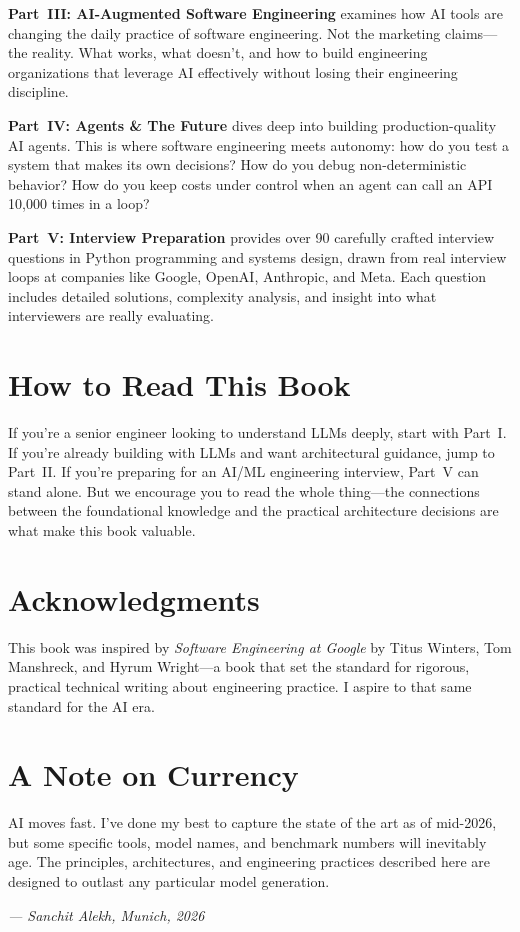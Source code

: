\textbf{Part~III: AI-Augmented Software Engineering} examines how AI tools are changing the daily practice of software engineering. Not the marketing claims---the reality. What works, what doesn't, and how to build engineering organizations that leverage AI effectively without losing their engineering discipline.

\textbf{Part~IV: Agents \& The Future} dives deep into building production-quality AI agents. This is where software engineering meets autonomy: how do you test a system that makes its own decisions? How do you debug non-deterministic behavior? How do you keep costs under control when an agent can call an API 10,000 times in a loop?

\textbf{Part~V: Interview Preparation} provides over 90 carefully crafted interview questions in Python programming and systems design, drawn from real interview loops at companies like Google, OpenAI, Anthropic, and Meta. Each question includes detailed solutions, complexity analysis, and insight into what interviewers are really evaluating.

\section*{How to Read This Book}

If you're a senior engineer looking to understand LLMs deeply, start with Part~I. If you're already building with LLMs and want architectural guidance, jump to Part~II. If you're preparing for an AI/ML engineering interview, Part~V can stand alone. But we encourage you to read the whole thing---the connections between the foundational knowledge and the practical architecture decisions are what make this book valuable.

\section*{Acknowledgments}

This book was inspired by \emph{Software Engineering at Google} by Titus Winters, Tom Manshreck, and Hyrum Wright---a book that set the standard for rigorous, practical technical writing about engineering practice. I aspire to that same standard for the AI era.

\section*{A Note on Currency}

AI moves fast. I've done my best to capture the state of the art as of mid-2026, but some specific tools, model names, and benchmark numbers will inevitably age. The principles, architectures, and engineering practices described here are designed to outlast any particular model generation.

\vspace{1cm}
\hfill\textit{--- Sanchit Alekh, Munich, 2026}
